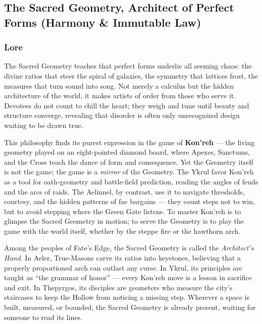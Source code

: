 
\subsection{The Sacred Geometry, Architect of Perfect Forms (Harmony \& Immutable Law)}

\subsubsection*{Lore}
The Sacred Geometry teaches that perfect forms underlie all seeming chaos: the divine ratios that steer the spiral of galaxies, the symmetry that lattices frost, the measures that turn sound into song. Not merely a calculus but the hidden architecture of the world, it makes artists of order from those who serve it. Devotees do not count to chill the heart; they weigh and tune until beauty and structure converge, revealing that disorder is often only unrecognized design waiting to be drawn true.

This philosophy finds its purest expression in the game of \textbf{Kon'reh} --- the living geometry played on an eight-pointed diamond board, where Apexes, Sanctums, and the Cross teach the dance of form and consequence. Yet the Geometry itself is not the game; the game is a \textit{mirror} of the Geometry. The Ykrul favor Kon'reh as a tool for oath-geometry and battle-field prediction, reading the angles of feuds and the arcs of raids. The Aelinnel, by contrast, use it to navigate thresholds, courtesy, and the hidden patterns of fae bargains --- they count steps not to win, but to avoid stepping where the Green Gate listens. To master Kon'reh is to glimpse the Sacred Geometry in motion; to serve the Geometry is to play the game with the world itself, whether by the steppe fire or the hawthorn arch.

Among the peoples of Fate's Edge, the Sacred Geometry is called the \textit{Architect's Hand}. In Aeler, True-Masons carve its ratios into keystones, believing that a properly proportioned arch can outlast any curse. In Ykrul, its principles are taught as ``the grammar of honor'' --- every Kon'reh move is a lesson in sacrifice and exit. In Thepyrgos, its disciples are geometers who measure the city's staircases to keep the Hollow from noticing a missing step. Wherever a space is built, measured, or bounded, the Sacred Geometry is already present, waiting for someone to read its lines.

